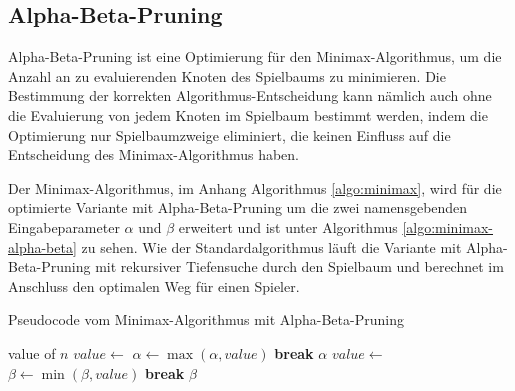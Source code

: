\subsection{Alpha-Beta-Pruning}

Alpha-Beta-Pruning ist eine Optimierung für den Minimax-Algorithmus, um die Anzahl an zu evaluierenden Knoten des Spielbaums zu minimieren. Die Bestimmung der korrekten Algorithmus-Entscheidung kann nämlich auch ohne die Evaluierung von jedem Knoten im Spielbaum bestimmt werden, indem die Optimierung nur Spielbaumzweige eliminiert, die keinen Einfluss auf die Entscheidung des Minimax-Algorithmus haben. \cite{AlgorithmsAlphaBetaPruning}

Der Minimax-Algorithmus, im Anhang Algorithmus \ref{algo:minimax}, wird für die optimierte Variante mit Alpha-Beta-Pruning um die zwei namensgebenden Eingabeparameter $\alpha$ und $\beta$ erweitert und ist unter Algorithmus \ref{algo:minimax-alpha-beta} zu sehen. Wie der Standardalgorithmus läuft die Variante mit Alpha-Beta-Pruning mit rekursiver Tiefensuche durch den Spielbaum und berechnet im Anschluss den optimalen Weg für einen Spieler.


\begin{algorithm}
    \caption{Pseudocode vom Minimax-Algorithmus mit Alpha-Beta-Pruning}
    \label{algo:minimax-alpha-beta}
    \begin{algorithmic}[1]
        \State \Return value of $n$
        \State $value \gets$ 
        \State $\alpha \gets \max(\alpha, value)$
        \If{$\alpha \geq \beta$}
        \State \textbf{break} 
        \EndIf
        \EndFor
        \State \Return $\alpha$
        \State $value \gets$ 
        \State $\beta \gets \min(\beta, value)$
        \If{$\beta \leq \alpha$}
        \State \textbf{break} 
        \EndIf
        \EndFor
        \State \Return $\beta$
        \EndIf
        \EndFunction
    \end{algorithmic}
\end{algorithm}

